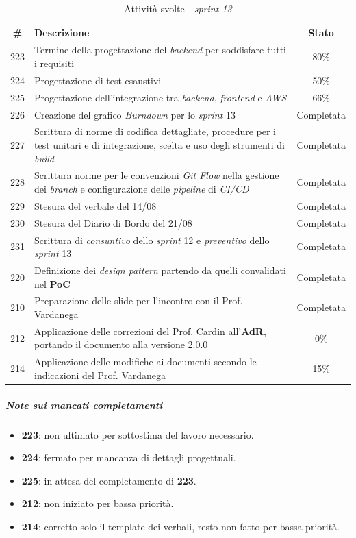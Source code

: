 \documentclass[12pt, a4paper]{article}
\begin{document}
{\begin{table}[H]
    \centering
    \renewcommand{\arraystretch}{1.3}
    \begin{tabularx}{\textwidth}{|c|X|c|}
        \hline
        \textbf{\#} & \textbf{Descrizione} & \textbf{Stato} \\ \hline
        223 & Termine della progettazione del \textit{backend} per soddisfare tutti i requisiti & 80\% \\ \hline
        224 & Progettazione di test esaustivi & 50\% \\ \hline
        225 & Progettazione dell'integrazione tra \textit{backend}, \textit{frontend} e \textit{AWS} & 66\% \\ \hline
        226 & Creazione del grafico \textit{Burndown} per lo \textit{sprint} 13 & Completata \\ \hline
        227 & Scrittura di norme di codifica dettagliate, procedure per i test unitari e di integrazione, scelta e uso degli strumenti di \textit{build} & Completata \\ \hline
        228 & Scrittura norme per le convenzioni \textit{Git Flow} nella gestione dei \textit{branch} e configurazione delle \textit{pipeline} di \textit{CI/CD} & Completata \\ \hline
        229 & Stesura del verbale del 14/08 & Completata \\ \hline
        230 & Stesura del Diario di Bordo del 21/08 & Completata \\ \hline
        231 & Scrittura di \textit{consuntivo} dello \textit{sprint} 12 e \textit{preventivo} dello \textit{sprint} 13 & Completata \\ \hline
        220 & Definizione dei \textit{design pattern} partendo da quelli convalidati nel \textbf{PoC} & Completata \\ \hline
        210 & Preparazione delle slide per l'incontro con il Prof. Vardanega & Completata \\ \hline
        212 & Applicazione delle correzioni del Prof. Cardin all'\textbf{AdR}, portando il documento alla versione 2.0.0 & 0\% \\ \hline
        214 & Applicazione delle modifiche ai documenti secondo le indicazioni del Prof. Vardanega & 15\% \\ \hline
    \end{tabularx}
    \caption{Attività svolte - \textit{sprint 13}}
\end{table}

\subparagraph{Note sui mancati completamenti}
\begin{itemize}
    \item \textbf{223}: non ultimato per sottostima del lavoro necessario.
    \item \textbf{224}: fermato per mancanza di dettagli progettuali.
    \item \textbf{225}: in attesa del completamento di \textbf{223}.
    \item \textbf{212}: non iniziato per bassa priorità.
    \item \textbf{214}: corretto solo il template dei verbali, resto non fatto per bassa priorità.
\end{itemize}

}
\end{document}
